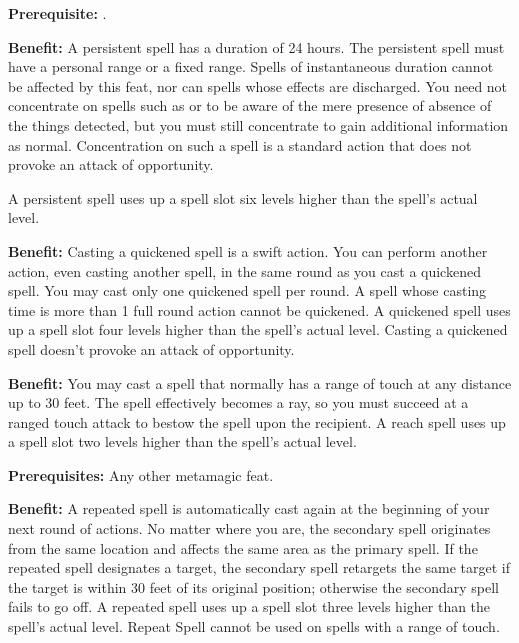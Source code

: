 \textbf{Prerequisite:} .

\textbf{Benefit:} A persistent spell has a duration of 24 hours. The persistent spell must have a personal range or a fixed range. Spells of instantaneous duration cannot be affected by this feat, nor can spells whose effects are discharged.  You need not concentrate on spells such as  or  to be aware of the mere presence of absence of the things detected, but you must still concentrate to gain additional information as normal.  Concentration on such a spell is a standard action that does not provoke an attack of opportunity. 

A persistent spell uses up a spell slot six levels higher than the spell's actual level.


\textbf{Benefit:} Casting a quickened spell is a swift action. You can perform another action, even casting another spell, in the same round as you cast a quickened spell. You may cast only one quickened spell per round. A spell whose casting time is more than 1 full round action cannot be quickened. A quickened spell uses up a spell slot four levels higher than the spell's actual level. Casting a quickened spell doesn't provoke an attack of opportunity.


\textbf{Benefit:} You may cast a spell that normally has a range of touch at any distance up to 30 feet. The spell effectively becomes a ray, so you must succeed at a ranged touch attack to bestow the spell upon the recipient. A reach spell uses up a spell slot two levels higher than the spell's actual level.


\textbf{Prerequisites:} Any other metamagic feat.

\textbf{Benefit:} A repeated spell is automatically cast again at the beginning of your next round of actions. No matter where you are, the secondary spell originates from the same location and affects the same area as the primary spell. If the repeated spell designates a target, the secondary spell retargets the same target if the target is within 30 feet of its original position; otherwise the secondary spell fails to go off. A repeated spell uses up a spell slot three levels higher than the spell's actual level. Repeat Spell cannot be used on spells with a range of touch.

